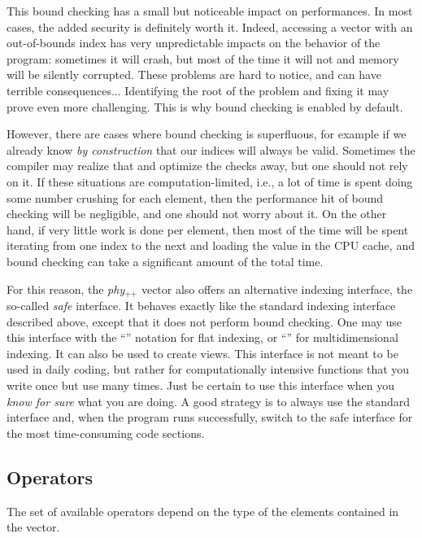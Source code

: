 \documentclass[12pt,a4paper]{report}
\newcommand{\phypp}{\textit{phy}$_{\text{++}}$\xspace}
\newenvironment{advanced}
{
    \begin{mdframed}[style=advanced,frametitle={Advanced}]
}
{
    \end{mdframed}
}
\begin{document}
\begin{advanced}
This bound checking has a small but noticeable impact on performances. In most cases, the added security is definitely worth it. Indeed, accessing a vector with an out-of-bounds index has very unpredictable impacts on the behavior of the program: sometimes it will crash, but most of the time it will not and memory will be silently corrupted. These problems are hard to notice, and can have terrible consequences... Identifying the root of the problem and fixing it may prove even more challenging. This is why bound checking is enabled by default.

However, there are cases where bound checking is superfluous, for example if we already know \emph{by construction} that our indices will always be valid. Sometimes the compiler may realize that and optimize the checks away, but one should not rely on it. If these situations are computation-limited, i.e., a lot of time is spent doing some number crushing for each element, then the performance hit of bound checking will be negligible, and one should not worry about it. On the other hand, if very little work is done per element, then most of the time will be spent iterating from one index to the next and loading the value in the CPU cache, and bound checking can take a significant amount of the total time.

For this reason, the \phypp vector also offers an alternative indexing interface, the so-called \emph{safe} interface. It behaves exactly like the standard indexing interface described above, except that it does not perform bound checking. One may use this interface with the ``'' notation for flat indexing, or ``'' for multidimensional indexing. It can also be used to create views. This interface is not meant to be used in daily coding, but rather for computationally intensive functions that you write once but use many times. Just be certain to use this interface when you \emph{know for sure} what you are doing. A good strategy is to always use the standard interface and, when the program runs successfully, switch to the safe interface for the most time-consuming code sections.
\end{advanced}

\subsection{Operators \label{SEC:core:vec:operator}}

The set of available operators depend on the type of the elements contained in the vector.
\end{document}
